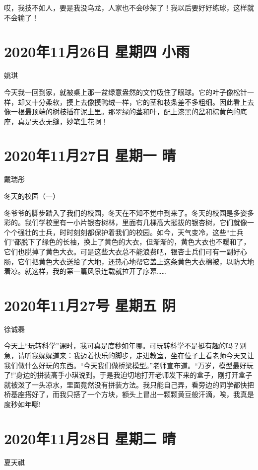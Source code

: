 哎，我技不如人，要是我没乌龙，人家也不会吵架了！我以后要好好练球，这样就不会输了！

\section{2020年11月26日 星期四 小雨}

姚琪

今天我一回到家，就被桌上那一盆绿意盎然的文竹吸住了眼球。它的叶子像松针一样，却又十分柔软，摸上去像摸鸭绒一样，它的茎和枝条差不多粗细。因此看上去像一根最顶端的树枝插在泥土里。那翠绿的茎和叶，配上漆黑的盆和棕黄色的底座，真是天衣无缝，妙笔生花啊！

\section{2020年11月27日 星期一 晴}

戴瑞彤

冬天的校园（一）

冬爷爷的脚步踏入了我们的校园，冬天在不知不觉中到来了。冬天的校园是多姿多彩的。我们学校里有一小片银杏树林，里面有几棵高大挺拔的银杏树，它们就像一个个强壮的士兵，时时刻刻都保护着我们的校园。如今，天气变冷，这些“士兵们”都脱下了绿色的长袖，换上了黄色的大衣，但渐渐的，黄色大衣也不暖和了，它们也脱掉了黄色大衣。可是这些大衣总不能浪费吧，银杏士兵们可有一副好心肠，它们把黄色大衣送给了大地，还热心地帮它盖上这条黄色大衣棉被，以防大地着凉。就这样，我的第一篇风景连载就拉开了序幕……

\section{2020年11月27号 星期五 阴}

徐诚磊

今天上“玩转科学”课时，我可真是度秒如年哪。可玩转科学不是挺有趣的吗？别急，请听我娓娓道来：我迈着快乐的脚步，走进教室，坐在位子上看老师今天又让我们做什么好玩的东西。“今天我们做桥梁模型。”老师宣布道。“万岁，模型最好玩了!”身边的拼装高手小琪说到。于是我迫切地打开老师发下来的盒子，刚打开盒子就被泼了一头凉水，里面竟然没有拼装方法。我只能自己弄，看旁边的同学都快把桥基座搭好了，而我只搭了一个方块，额头上冒出一颗颗黄豆般汗滴，唉，我真是度秒如年哪!

\section{2020年11月28日 星期二 晴}

夏天祺

